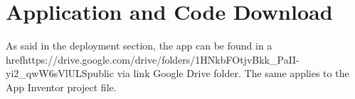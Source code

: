 \chapter{Application and Code Download}
As said in the deployment section, the app can be found in a href{https://drive.google.com/drive/folders/1HNkbFOtjvBkk_PaII-yi2_qwW6sVlULS}{public via link Google Drive folder}. The same applies to the App Inventor project file.
